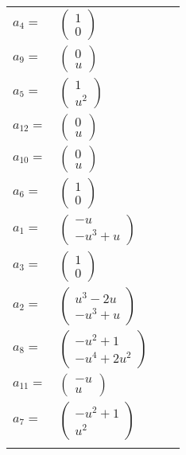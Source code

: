 \documentclass[1p]{elsarticle_modified}
\theoremstyle{definition}
\begin{document}
\begin{tabular}{m{7pt} m{180pt} m{7pt} m{180pt} }
\flushright $a_{4}=$&$\begin{pmatrix}1\\0\end{pmatrix}$ \\
\flushright $a_{9}=$&$\begin{pmatrix}0\\u\end{pmatrix}$ \\
\flushright $a_{5}=$&$\begin{pmatrix}1\\u^2\end{pmatrix}$ \\
\flushright $a_{12}=$&$\begin{pmatrix}0\\u\end{pmatrix}$ \\
\flushright $a_{10}=$&$\begin{pmatrix}0\\u\end{pmatrix}$ \\
\flushright $a_{6}=$&$\begin{pmatrix}1\\0\end{pmatrix}$ \\
\flushright $a_{1}=$&$\begin{pmatrix}- u\\- u^3+u\end{pmatrix}$ \\
\flushright $a_{3}=$&$\begin{pmatrix}1\\0\end{pmatrix}$ \\
\flushright $a_{2}=$&$\begin{pmatrix}u^3-2 u\\- u^3+u\end{pmatrix}$ \\
\flushright $a_{8}=$&$\begin{pmatrix}- u^2+1\\- u^4+2 u^2\end{pmatrix}$ \\
\flushright $a_{11}=$&$\begin{pmatrix}- u\\u\end{pmatrix}$ \\
\flushright $a_{7}=$&$\begin{pmatrix}- u^2+1\\u^2\end{pmatrix}$\\&\end{tabular}
\end{document}
